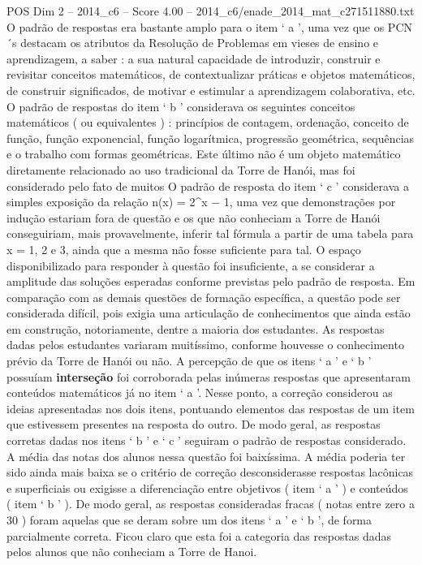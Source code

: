 \begin{textsample}{POS Dim 2 – 2014\_c6 – Score 4.00 – 2014\_c6/enade\_2014\_mat\_c271511880.txt}
O padrão de respostas era bastante amplo para o item ‘ a ’, uma vez que os PCN´s destacam os atributos da Resolução de Problemas em vieses de ensino e aprendizagem, a saber : a sua natural capacidade de introduzir, construir e revisitar conceitos matemáticos, de contextualizar práticas e objetos matemáticos, de construir significados, de motivar e estimular a aprendizagem colaborativa, etc.
O padrão de respostas do item ‘ b ’ considerava os seguintes conceitos matemáticos ( ou equivalentes ) : princípios de contagem, ordenação, conceito de função, função exponencial, função logarítmica, progressão geométrica, sequências e o trabalho com formas geométricas.
Este último não é um objeto matemático diretamente relacionado ao uso tradicional da Torre de Hanói, mas foi considerado pelo fato de muitos O padrão de resposta do item ‘ c ’ considerava a simples exposição da relação n(x) = 2\textasciicircum{}x − 1, uma vez que demonstrações por indução estariam fora de questão e os que não conheciam a Torre de Hanói conseguiriam, mais provavelmente, inferir tal fórmula a partir de uma tabela para x = 1, 2 e 3, ainda que a mesma não fosse suficiente para tal.
O espaço disponibilizado para responder à questão foi insuficiente, a se considerar a amplitude das soluções esperadas conforme previstas pelo padrão de resposta.
Em comparação com as demais questões de formação específica, a questão pode ser considerada difícil, pois exigia uma articulação de conhecimentos que ainda estão em construção, notoriamente, dentre a maioria dos estudantes.
As respostas dadas pelos estudantes variaram muitíssimo, conforme houvesse o conhecimento prévio da Torre de Hanói ou não.
A percepção de que os itens ‘ a ’ e ‘ b ’ possuíam \textbf{interseção} foi corroborada pelas inúmeras respostas que apresentaram conteúdos matemáticos já no item ‘ a ’.
Nesse ponto, a correção considerou as ideias apresentadas nos dois itens, pontuando elementos das respostas de um item que estivessem presentes na resposta do outro.
De modo geral, as respostas corretas dadas nos itens ‘ b ’ e ‘ c ’ seguiram o padrão de respostas considerado.
A média das notas dos alunos nessa questão foi baixíssima.
A média poderia ter sido ainda mais baixa se o critério de correção desconsiderasse respostas lacônicas e superficiais ou exigisse a diferenciação entre objetivos ( item ‘ a ’ ) e conteúdos ( item ‘ b ’ ).
De modo geral, as respostas consideradas fracas ( notas entre zero a 30 ) foram aquelas que se deram sobre um dos itens ‘ a ’ e ‘ b ’, de forma parcialmente correta.
Ficou claro que esta foi a categoria das respostas dadas pelos alunos que não conheciam a Torre de Hanoi.

\end{textsample}
